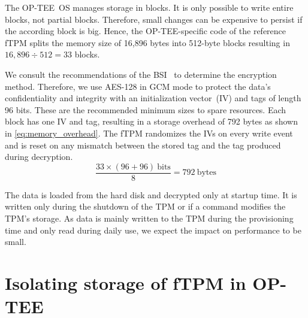 The OP-TEE~OS manages storage in blocks.
It is only possible to write entire blocks, not partial blocks.
Therefore, small changes can be expensive to persist if the according block is big.
Hence, the OP-TEE-specific code of the reference fTPM splits the memory size of 16,896 bytes into 512-byte blocks resulting in \( 16{,}896 \div 512 = 33 \) blocks.

We consult the recommendations of the BSI~\cite{bsi-key-recommendations} to determine the encryption method.
Therefore, we use AES-128 in GCM mode to protect the data's confidentiality and integrity with an initialization vector~(IV) and tags of length 96 bits.
These are the recommended minimum sizes to spare resources.
Each block has one IV and tag, resulting in a storage overhead of 792 bytes as shown in \autoref{eq:memory_overhead}.
The \ac{fTPM} randomizes the IVs on every write event and is reset on any mismatch between the stored tag and the tag produced during decryption.
\begin{equation}
  \label{eq:memory_overhead}
  \frac{33 \times (96 + 96)\ \text{bits}}{8} = 792\ \text{bytes}
\end{equation}

The data is loaded from the hard disk and decrypted only at startup time.
It is written only during the shutdown of the TPM or if a command modifies the TPM's storage.
As data is mainly written to the TPM during the provisioning time and only read during daily use, we expect the impact on performance to be small.

\section{Isolating storage of fTPM in OP-TEE}

